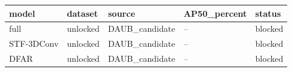\begin{tabular}{lllll}
\hline
model & dataset & source & AP50\_percent & status \\
\hline
full & unlocked & DAUB\_candidate & -- & blocked \\
STF-3DConv & unlocked & DAUB\_candidate & -- & blocked \\
DFAR & unlocked & DAUB\_candidate & -- & blocked \\
\hline
\end{tabular}
